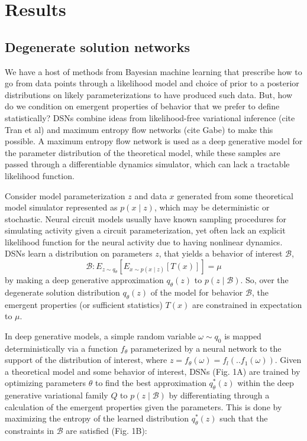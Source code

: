 \documentclass[11pt]{article}
\begin{document}
\section{Results}
\subsection{Degenerate solution networks}
We have a host of methods from Bayesian machine learning that prescribe how to go from data points through a likelihood model and choice of prior to a posterior distributions on likely parameterizations to have produced such data.  But, how do we condition on emergent properties of behavior that we prefer to define statistically?  DSNs combine ideas from likelihood-free variational inference (cite Tran et al) and maximum entropy flow networks (cite Gabe) to make this possible.  A maximum entropy flow network is used as a deep generative model for the parameter distribution of the theoretical model, while these samples are passed through a differentiable dynamics simulator, which can lack a tractable likelihood function.

Consider model parameterization $z$ and data $x$ generated from some theoretical model simulator represented as $p(x \mid z)$, which may be deterministic or stochastic.  Neural circuit models usually have known sampling procedures for simulating activity given a circuit parameterization, yet often lack an explicit likelihood function for the neural activity due to having nonlinear dynamics. DSNs learn a distribution on parameters $z$, that yields a behavior of interest $\mathcal{B}$,
\begin{equation}
\mathcal{B}: E_{z \sim q_\theta}\left[ E_{x\sim p(x \mid z)}\left[T(x)\right] \right] = \mu
\end{equation}
by making a deep generative approximation $q_\theta(z)$ to $p(z \mid \mathcal{B})$.  So, over the degenerate solution distribution $q_\theta(z)$ of the model for behavior $\mathcal{B}$, the emergent properties (or sufficient statistics) $T(x)$ are constrained in expectation to $\mu$.

 In deep generative models, a simple random variable $\omega \sim q_0$ is mapped deterministically via a function $f_\theta$ parameterized by a neural network to the support of the distribution of interest, where $z = f_{\theta}(\omega) = f_l(..f_1(\omega))$.  Given a theoretical model and some behavior of interest, DSNs (Fig. 1A) are trained by optimizing parameters $\theta$ to find the best approximation $q_{\theta}^*(z)$ within the deep generative variational family $Q$ to $p(z \mid \mathcal{B})$ by differentiating through a calculation of the emergent properties given the parameters.  This is done by maximizing the entropy of the learned distribution $q_{\theta}^*(z)$ such that the constraints in $\mathcal{B}$ are satisfied (Fig. 1B):
\end{document}
